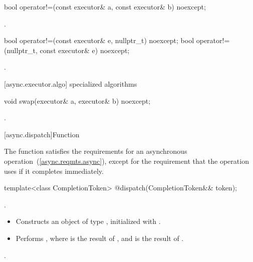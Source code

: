 %
\begin{itemdecl}
bool operator!=(const executor& a, const executor& b) noexcept;
\end{itemdecl}

\begin{itemdescr}
\pnum
\returns {}.
\end{itemdescr}

%
\begin{itemdecl}
bool operator!=(const executor& e, nullptr_t) noexcept;
bool operator!=(nullptr_t, const executor& e) noexcept;
\end{itemdecl}

\begin{itemdescr}
\pnum
\returns {}.
\end{itemdescr}



[async.executor.algo]{ specialized algorithms}

%
\begin{itemdecl}
void swap(executor& a, executor& b) noexcept;
\end{itemdecl}

\begin{itemdescr}
\pnum
\effects {}.
\end{itemdescr}




[async.dispatch]{Function }

%
\pnum
\begin{note} The function  satisfies the requirements for an asynchronous operation~(\ref{async.reqmts.async}), except for the requirement that the operation uses  if it completes immediately. \end{note}

\begin{itemdecl}
template<class CompletionToken>
  @\DEDUCED@ dispatch(CompletionToken&& token);
\end{itemdecl}

\begin{itemdescr}
\pnum
\completionsig {}.

\pnum
\effects 
\begin{itemize}
\item
 Constructs an object  of type , initialized with .
\item
 Performs , where  is the result of , and  is the result of .
\end{itemize}

\pnum
\returns {}.
\end{itemdescr}

